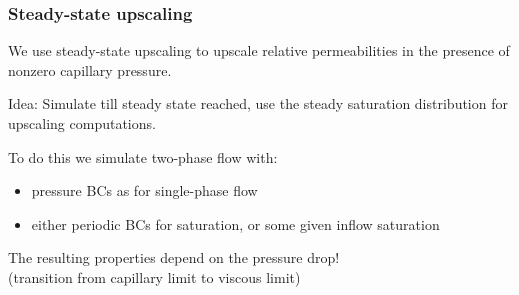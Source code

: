 \documentclass[UKenglish,10pt]{beamer}
\newcommand{\Code}[1]{\texttt{#1}}
\begin{document}









\begin{frame}
  \frametitle{Steady-state upscaling}

  We use steady-state upscaling to upscale relative permeabilities in
  the presence of nonzero capillary pressure.
  \bigskip

  Idea: Simulate till steady state reached, use the steady saturation
  distribution for upscaling computations.
  \bigskip

  To do this we simulate two-phase flow with:
  \begin{itemize}
  \item pressure BCs as for single-phase flow
  \item either periodic BCs for saturation, or some given inflow saturation
  \end{itemize}

  The resulting properties depend on the pressure drop! \\
  (transition from capillary limit to viscous limit)
\end{frame}




\end{document}
